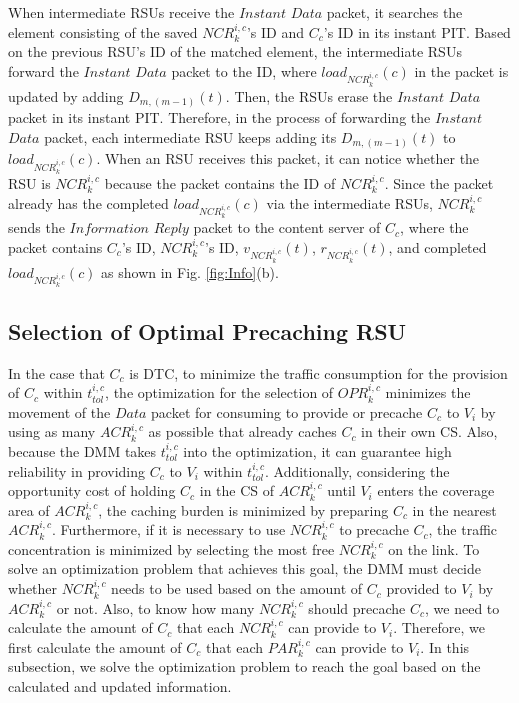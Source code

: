 \documentclass{ieeeaccess}
\begin{document}
When intermediate RSUs receive the $Instant$ $Data$ packet, it searches the element consisting of the saved $NCR^{i,c}_{k}$'s ID and $C_{c}$'s ID in its instant PIT.
Based on the previous RSU's ID of the matched element, the intermediate RSUs forward the $Instant$ $Data$ packet to the ID, where $load_{NCR^{i,c}_{k}}(c)$ in the packet is updated by adding $D_{m,(m-1)}(t)$.
Then, the RSUs erase the $Instant$ $Data$ packet in its instant PIT.
Therefore, in the process of forwarding the $Instant$ $Data$ packet, each intermediate RSU keeps adding its $D_{m,(m-1)}(t)$ to $load_{NCR^{i,c}_{k}}(c)$.
When an RSU receives this packet, it can notice whether the RSU is $NCR^{i,c}_{k}$ because the packet contains the ID of $NCR^{i,c}_{k}$.
Since the packet already has the completed $load_{NCR^{i,c}_{k}}(c)$ via the intermediate RSUs, $NCR^{i,c}_{k}$ sends the $Information$ $Reply$ packet to the content server of $C_{c}$, where the packet contains $C_{c}$'s ID, $NCR^{i,c}_{k}$'s ID, $v_{NCR^{i,c}_{k}}(t)$, $r_{NCR^{i,c}_{k}}(t)$, and completed $load_{NCR^{i,c}_{k}}(c)$ as shown in Fig. \ref{fig:Info}(b).



\subsection{Selection of Optimal Precaching RSU} \label{sec.p3}
In the case that $C_{c}$ is DTC, to minimize the traffic consumption for the provision of $C_{c}$ within $t^{i,c}_{tol}$, the optimization for the selection of $OPR^{i,c}_{k}$ minimizes the movement of the $Data$ packet for consuming to provide or precache $C_{c}$ to $V_{i}$ by using as many $ACR^{i,c}_{k}$ as possible that already caches $C_{c}$ in their own CS.
Also, because the DMM takes $t^{i,c}_{tol}$ into the optimization, it can guarantee high reliability in providing $C_{c}$ to $V_{i}$ within $t^{i,c}_{tol}$.
Additionally, considering the opportunity cost of holding $C_{c}$ in the CS of $ACR^{i,c}_{k}$ until $V_{i}$ enters the coverage area of $ACR^{i,c}_{k}$, the caching burden is minimized by preparing $C_{c}$ in the nearest $ACR^{i,c}_{k}$.
Furthermore, if it is necessary to use $NCR^{i,c}_{k}$ to precache $C_{c}$, the traffic concentration is minimized by selecting the most free $NCR^{i,c}_{k}$ on the link.
To solve an optimization problem that achieves this goal, the DMM must decide whether $NCR^{i,c}_{k}$ needs to be used based on the amount of $C_{c}$ provided to $V_{i}$ by $ACR^{i,c}_{k}$ or not.
Also, to know how many $NCR^{i,c}_{k}$ should precache $C_{c}$, we need to calculate the amount of $C_{c}$ that each $NCR^{i,c}_{k}$ can provide to $V_{i}$.
Therefore, we first calculate the amount of $C_{c}$ that each $PAR^{i,c}_{k}$ can provide to $V_{i}$.
In this subsection, we solve the optimization problem to reach the goal based on the calculated and updated information.
\end{document}
